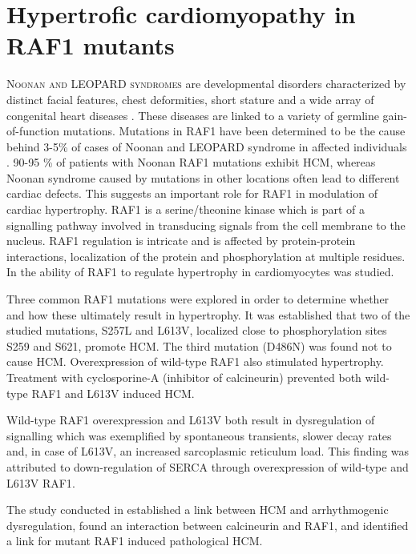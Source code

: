 \chapter{Hypertrofic cardiomyopathy in RAF1 mutants}
\label{ch:noonan}
\lettrine[lines=2, lhang=0.33, loversize=0.25]{N}{oonan and LEOPARD syndromes} are developmental disorders characterized
by distinct facial features, chest deformities, short stature and a wide array
of congenital heart diseases \cite{Allanson_87_JMedGenet_24_p9}. These diseases are linked to a
variety of germline gain-of-function mutations. Mutations in \ac{RAF1} have
been determined to be the cause behind 3-5\% of cases of Noonan and LEOPARD 
syndrome in affected individuals \cite{P_07_NatGenet_39_p1007}. 90-95 \% of patients with Noonan
\ac{RAF1} mutations exhibit \ac{HCM}, whereas Noonan
syndrome caused by mutations in other locations often lead to different
cardiac defects. This suggests an important role for \ac{RAF1} in modulation
of cardiac hypertrophy. 
\ac{RAF1} is a serine/theonine kinase which is part of a signalling pathway
involved in transducing signals from the cell membrane to the nucleus.
\ac{RAF1} regulation is intricate and is affected by protein-protein interactions,
localization of the protein and phosphorylation at multiple residues. In \PaperII the
ability of \ac{RAF1} to regulate hypertrophy in cardiomyocytes was studied. 

Three common \ac{RAF1} mutations were explored in order to determine whether
and how these ultimately result in hypertrophy. It was established that two of
the studied mutations, S257L and L613V, localized close to
phosphorylation sites S259 and S621, promote \ac{HCM}. The third mutation
(D486N) was found not to cause \ac{HCM}. Overexpression of wild-type
\ac{RAF1} also stimulated hypertrophy. Treatment with cyclosporine-A
(inhibitor of calcineurin) prevented both wild-type \ac{RAF1} and L613V
induced \ac{HCM}. 

Wild-type \ac{RAF1} overexpression and L613V both result in dysregulation of
 signalling which was exemplified by spontaneous 
transients, slower decay rates and, in case of L613V, an increased sarcoplasmic reticulum
 load. This finding was attributed to down-regulation of
\ac{SERCA} through overexpression of wild-type and L613V \ac{RAF1}.

The study conducted in \PaperII established a link between \ac{HCM} and
arrhythmogenic  dysregulation, found an interaction between
calcineurin and \ac{RAF1}, and identified a link for mutant \ac{RAF1} induced
pathological \ac{HCM}.


